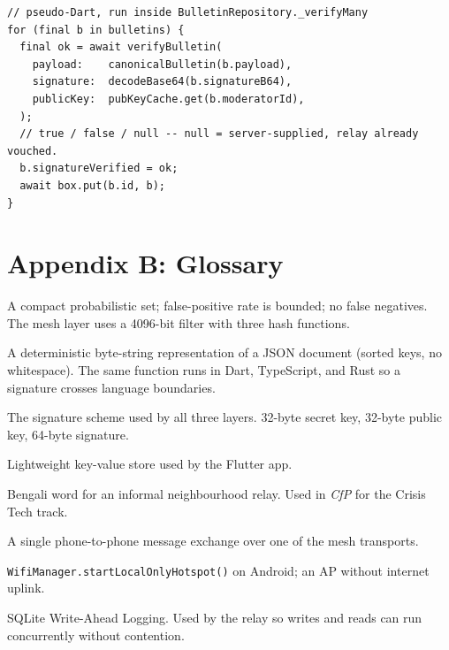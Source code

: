 \documentclass[11pt,a4paper]{article}
\begin{document}
\begin{lstlisting}[language=dartcode]
// pseudo-Dart, run inside BulletinRepository._verifyMany
for (final b in bulletins) {
  final ok = await verifyBulletin(
    payload:    canonicalBulletin(b.payload),
    signature:  decodeBase64(b.signatureB64),
    publicKey:  pubKeyCache.get(b.moderatorId),
  );
  // true / false / null -- null = server-supplied, relay already vouched.
  b.signatureVerified = ok;
  await box.put(b.id, b);
}
\end{lstlisting}

\section{Appendix B: Glossary}
\label{sec:appendix-gloss}

\begin{description}[leftmargin=*,style=nextline]
  \item[Bloom filter] A compact probabilistic set; false-positive rate
        is bounded; no false negatives. The mesh layer uses a 4096-bit
        filter with three hash functions.
  \item[Canonical JSON] A deterministic byte-string representation of
        a JSON document (sorted keys, no whitespace). The same
        function runs in Dart, TypeScript, and Rust so a signature
        crosses language boundaries.
  \item[Ed25519] The signature scheme used by all three layers. 32-byte
        secret key, 32-byte public key, 64-byte signature.
  \item[Hive] Lightweight key-value store used by the Flutter app.
  \item[Jogajog] Bengali word for an informal neighbourhood relay.
        Used in \emph{CfP} for the Crisis Tech track.
  \item[Peer hop] A single phone-to-phone message exchange over one of
        the mesh transports.
  \item[Soft-AP] \texttt{WifiManager.startLocalOnlyHotspot()} on
        Android; an AP without internet uplink.
  \item[WAL] SQLite Write-Ahead Logging. Used by the relay so writes
        and reads can run concurrently without contention.
\end{description}
\end{document}
